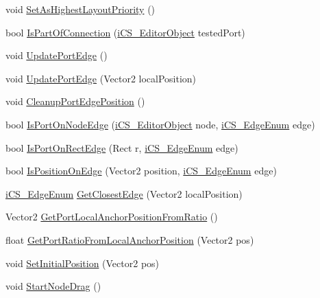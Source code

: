 \begin{DoxyCompactItemize}
\item 
void \hyperlink{classi_c_s___editor_object_a6c9add6f74cc0f824f76cacbb62b253d}{Set\+As\+Highest\+Layout\+Priority} ()
\item 
bool \hyperlink{classi_c_s___editor_object_a8c1a85d2e3ca457cbc4f4a2a68cc4584}{Is\+Part\+Of\+Connection} (\hyperlink{classi_c_s___editor_object}{i\+C\+S\+\_\+\+Editor\+Object} tested\+Port)
\item 
void \hyperlink{classi_c_s___editor_object_ad3e1b7b9a3134052b162d9b6cf30d00f}{Update\+Port\+Edge} ()
\item 
void \hyperlink{classi_c_s___editor_object_a629e380b366cb4f138a124b616c954c2}{Update\+Port\+Edge} (Vector2 local\+Position)
\item 
void \hyperlink{classi_c_s___editor_object_a4e060236d5088965f0d72ff711ebdace}{Cleanup\+Port\+Edge\+Position} ()
\item 
bool \hyperlink{classi_c_s___editor_object_af8b97d49d83ba1b9d478d45f4d72a884}{Is\+Port\+On\+Node\+Edge} (\hyperlink{classi_c_s___editor_object}{i\+C\+S\+\_\+\+Editor\+Object} node, \hyperlink{i_c_s___edge_enum_8cs_af0c43d9550817659c245d5d49fbb4771}{i\+C\+S\+\_\+\+Edge\+Enum} edge)
\item 
bool \hyperlink{classi_c_s___editor_object_a38008b6e6503c229cbc1e1ef7f9b6852}{Is\+Port\+On\+Rect\+Edge} (Rect r, \hyperlink{i_c_s___edge_enum_8cs_af0c43d9550817659c245d5d49fbb4771}{i\+C\+S\+\_\+\+Edge\+Enum} edge)
\item 
bool \hyperlink{classi_c_s___editor_object_a6af9b87b000bc426da7aedc80fa4ee99}{Is\+Position\+On\+Edge} (Vector2 position, \hyperlink{i_c_s___edge_enum_8cs_af0c43d9550817659c245d5d49fbb4771}{i\+C\+S\+\_\+\+Edge\+Enum} edge)
\item 
\hyperlink{i_c_s___edge_enum_8cs_af0c43d9550817659c245d5d49fbb4771}{i\+C\+S\+\_\+\+Edge\+Enum} \hyperlink{classi_c_s___editor_object_adf74adfe122fbd064a5eeb6f4cf243db}{Get\+Closest\+Edge} (Vector2 local\+Position)
\item 
Vector2 \hyperlink{classi_c_s___editor_object_ad4098b28e196d87d737aa16345912a94}{Get\+Port\+Local\+Anchor\+Position\+From\+Ratio} ()
\item 
float \hyperlink{classi_c_s___editor_object_aa8c84b122fb74b0637f4df7621cb36ae}{Get\+Port\+Ratio\+From\+Local\+Anchor\+Position} (Vector2 pos)
\item 
void \hyperlink{classi_c_s___editor_object_a224cde016a24a29ae6fb4f634049969b}{Set\+Initial\+Position} (Vector2 pos)
\item 
void \hyperlink{classi_c_s___editor_object_a60208fc1b167c640c08fdb2221309257}{Start\+Node\+Drag} ()

\end{DoxyCompactItemize}
